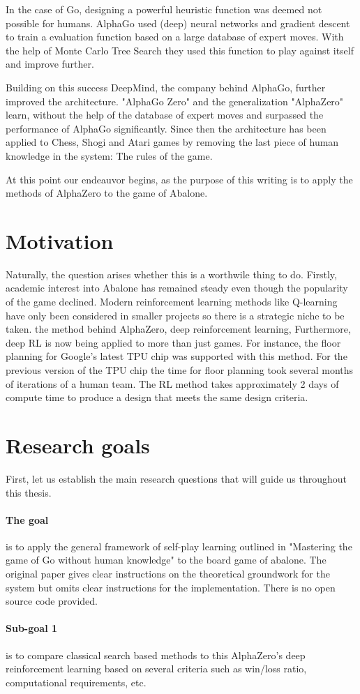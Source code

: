In the case of Go, designing a powerful heuristic function was deemed not possible for humans. AlphaGo used (deep) neural networks and gradient descent to train a evaluation function based on a large database of expert moves. With the help of Monte Carlo Tree Search they used this function to play against itself and improve further. \cite{silver_mastering_2017}

Building on this success DeepMind, the company behind AlphaGo, further improved the architecture. "AlphaGo Zero" and the generalization "AlphaZero"  learn, without the help of the database of expert moves and surpassed the performance of AlphaGo significantly. Since then the architecture has been applied to Chess, Shogi and Atari games by removing the last piece of human knowledge in the system: The rules of the game. \cite{schrittwieser_mastering_2020}

At this point our endeauvor begins, as the purpose of this writing is to apply the methods of AlphaZero to the game of Abalone.

\section{Motivation}
Naturally, the question arises whether this is a worthwile thing to do. Firstly, academic interest into Abalone has remained steady even though the popularity of the game declined. Modern reinforcement learning methods like Q-learning have only been considered in smaller projects \cite{mizrachi_introduction_2017} so there is a strategic niche to be taken.
the method behind AlphaZero, deep reinforcement learning,
Furthermore, deep RL is now being applied to more than just games. For instance, the floor planning for Google's latest TPU chip was supported with this method. For the previous version of the TPU chip the time for floor planning took several months of iterations of a human team. The RL method takes approximately 2 days of compute time to produce a design that meets the same design criteria. \cite{mirhoseini_graph_2021}

\section{Research goals}
First, let us establish the main research questions that will guide us throughout this thesis.

\paragraph{The goal} is to apply the general framework of self-play learning outlined in "Mastering the game of Go without human knowledge" to the board game of abalone. \cite{silver_mastering_2017} The original paper gives clear instructions on the theoretical groundwork for the system but omits clear instructions for the implementation. There is no open source code provided.

\paragraph{Sub-goal 1} is to compare classical search based methods to this AlphaZero's deep reinforcement learning based on several criteria such as win/loss ratio, computational requirements, etc.